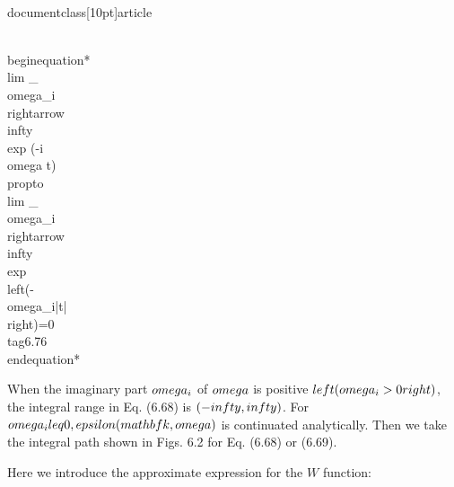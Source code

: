 \\documentclass[10pt]{article}
\begin{document}
{{{{\\begin{equation*}
\\lim _{\\omega_{i} \\rightarrow \\infty} \\exp (-i \\omega t) \\propto \\lim _{\\omega_{i} \\rightarrow \\infty} \\exp \\left(-\\omega_{i}|t|\\right)=0 \\tag{6.76}
\\end{equation*}


When the imaginary part $\\omega_{i}$ of $\\omega$ is positive $\\left(\\omega_{i}>0\\right)$, the integral range in Eq. (6.68) is $(-\\infty, \\infty)$. For $\\omega_{i} \\leq 0, \\epsilon(\\mathbf{k}, \\omega)$ is continuated analytically. Then we take the integral path shown in Figs. 6.2 for Eq. (6.68) or (6.69).

Here we introduce the approximate expression for the $W$ function:


}}}}
\end{document}
